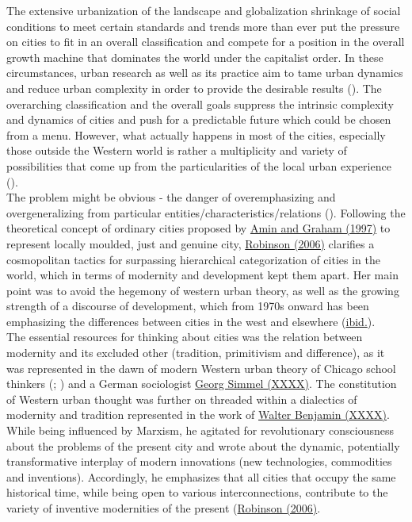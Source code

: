 \documentclass[11pt]{report}
\begin{document}
The extensive urbanization of the landscape and globalization shrinkage of social conditions to meet certain standards and trends more than ever put the pressure on cities to fit in an overall classification and compete for a position in the overall growth machine that dominates the world under the capitalist order.
In these circumstances, urban research as well as its practice aim to tame urban dynamics and reduce urban complexity in order to provide the desirable results
(\href{Jacobs}{\cite{Jacobs1984????}}).
The overarching classification and the overall goals suppress the intrinsic complexity and dynamics of cities and push for a predictable future which could be chosen  from a menu. However, what actually happens in most of the cities, especially those outside the Western world is rather a multiplicity and variety of possibilities that come up from the particularities of the local urban experience (\href{Amin}{\cite{Amin2006}}).
\\

The problem might be obvious - the danger of overemphasizing and overgeneralizing from particular entities/characteristics/relations (\href{Thrift}{\cite{Thrift1996}}).
Following the theoretical concept of ordinary cities proposed by 
\href{Amin}{Amin and Graham (1997)} to represent locally moulded, just and genuine city, \href{Robinson}{Robinson (2006)} clarifies a cosmopolitan  tactics  for  surpassing  hierarchical categorization of cities in the world, which in terms of modernity and development kept them apart.
Her main point was to avoid the hegemony of western urban theory, as  well as the growing  strength of a discourse of development, which from 1970s onward has been emphasizing the differences between cities in the west and elsewhere (\href{Robinson}{ibid.}). 
\\

The essential  resources  for  thinking  about  cities  was  the relation  between  modernity  and its  excluded  other  (tradition,  primitivism  and  difference),  as  it  was represented  in  the  dawn  of modern Western  urban  theory  of  Chicago  school  thinkers  (\href{Park}{\cite{Park??????}}; \href{Wirth}{\cite{Wirth????}})
and a German sociologist \href{Simmel}{Georg Simmel (XXXX)}. 
The constitution of Western urban thought was further on threaded within a dialectics of modernity and 
tradition represented in the work of \href{Benjamin}{Walter Benjamin (XXXX)}. While being influenced by Marxism, he agitated 
for revolutionary consciousness about the problems of the present city and wrote about the dynamic, potentially transformative interplay of modern innovations (new technologies, commodities and inventions).
Accordingly, he emphasizes that all cities that occupy the same historical time, while being open  to  various  interconnections,  contribute  to  the  variety  of  inventive  modernities  of  the  present 
(\href{Robinson}{Robinson (2006)}. 
\\
\end{document}
